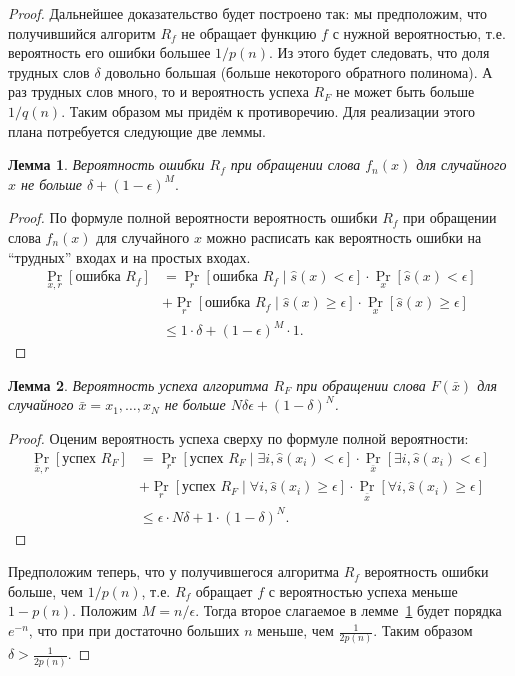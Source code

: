 \documentclass[12pt]{article}
\theoremstyle{definition}
\theoremstyle{plain}
\newtheorem{lemma}{Лемма}[section]
\theoremstyle{remark}
\begin{document}
\begin{proof}
Дальнейшее доказательство будет построено так: мы предположим, что получившийся алгоритм $R_f$ 
не обращает функцию $f$ с нужной вероятностью, т.е. вероятность его ошибки большее $1/p(n)$.
Из этого будет следовать, что доля трудных слов $\delta$ довольно большая 
(больше некоторого обратного полинома). А раз трудных слов много, то и вероятность успеха 
$R_F$ не может быть больше $1/q(n)$. Таким образом мы придём к противоречию.
Для реализации этого плана потребуется следующие две леммы.
\begin{lemma}\label{lm:owf:rf}
Вероятность ошибки $R_f$ при обращении слова $f_n(x)$ 
для случайного $x$ не больше $\delta + (1 - \epsilon)^M.$
\end{lemma}
\begin{proof}
По формуле полной вероятности вероятность ошибки $R_f$ 
при обращении слова $f_n(x)$ для случайного $x$ можно расписать
как вероятность ошибки на ``трудных'' входах и на простых входах.
$$\begin{aligned}
\Pr_{x,r}[\text{ошибка $R_f$}] 
&= \Pr_r[\text{ошибка $R_f$}\mid \hat s(x) <   \epsilon] \cdot \Pr_x[\hat s(x) <   \epsilon]\\ 
&+ \Pr_r[\text{ошибка $R_f$}\mid \hat s(x) \ge \epsilon] \cdot \Pr_x[\hat s(x) \ge \epsilon]\\
&\le 1 \cdot \delta + (1 - \epsilon)^M \cdot 1.
\end{aligned}
$$
\end{proof}

\begin{lemma}\label{lm:owf:rfn}
Вероятность успеха алгоритма $R_F$ при обращении слова $F(\bar x)$ 
для случайного $\bar x = x_1,\dotsc,x_N$ не больше $N\delta\epsilon + (1 - \delta)^N$.
\end{lemma}
\begin{proof}
Оценим вероятность успеха сверху по формуле полной вероятности:
$$\begin{aligned}
\Pr_{\bar x,r}[\text{успех $R_F$}] 
&= \Pr_r[\text{успех $R_F$}\mid \exists i, \hat s(x_i) <   \epsilon] \cdot \Pr_{\bar x}[\exists i, \hat s(x_i) < \epsilon]\\
&+ \Pr_r[\text{успех $R_F$}\mid \forall i, \hat s(x_i) \ge \epsilon] \cdot \Pr_{\bar x}[\forall i, \hat s(x_i) \ge \epsilon]\\
&\le \epsilon \cdot N\delta + 1 \cdot (1 - \delta)^N.
\end{aligned}
$$
\end{proof}

Предположим теперь, что у получившегося алгоритма $R_f$ вероятность ошибки больше, чем $1/p(n)$, 
т.е. $R_f$ обращает $f$ с вероятностью успеха меньше $1-p(n)$. Положим $M = n / \epsilon$. 
Тогда второе слагаемое в лемме~\ref{lm:owf:rf} будет порядка $e^{-n}$, что при
при достаточно больших $n$ меньше, чем $\frac{1}{2p(n)}$.  Таким образом
$\delta > \frac{1}{2p(n)}$.


\end{proof}
\end{document}
